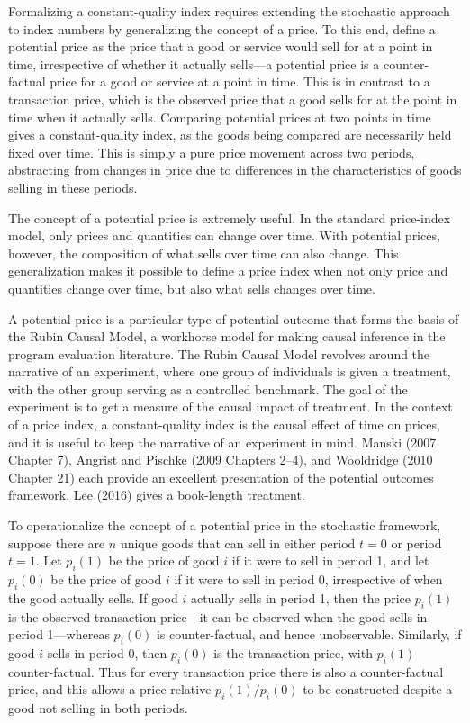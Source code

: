 \documentclass[]{article}
\begin{document}
Formalizing a constant-quality index requires extending the stochastic approach to index numbers by generalizing the concept of a price. To this end, define a potential price as the price that a good or service would sell for at a point in time, irrespective of whether it actually sells---a potential price is a counter-factual price for a good or service at a point in time. This is in contrast to a transaction price, which is the observed price that a good sells for at the point in time when it actually sells. Comparing potential prices at two points in time gives a constant-quality index, as the goods being compared are necessarily held fixed over time. This is simply a pure price movement across two periods, abstracting from changes in price due to differences in the characteristics of goods selling in these periods.

The concept of a potential price is extremely useful. In the standard price-index model, only prices and quantities can change over time. With potential prices, however, the composition of what sells over time can also change. This generalization makes it possible to define a price index when not only price and quantities change over time, but also what sells changes over time.

A potential price is a particular type of potential outcome that forms the basis of the Rubin Causal Model, a workhorse model for making causal inference in the program evaluation literature. The Rubin Causal Model revolves around the narrative of an experiment, where one group of individuals is given a treatment, with the other group serving as a controlled benchmark. The goal of the experiment is to get a measure of the causal impact of treatment. In the context of a price index, a constant-quality index is the causal effect of time on prices, and it is useful to keep the narrative of an experiment in mind. Manski (2007 Chapter 7), Angrist and Pischke (2009 Chapters 2--4), and Wooldridge (2010 Chapter 21) each provide an excellent presentation of the potential outcomes framework. Lee (2016) gives a book-length treatment.

To operationalize the concept of a potential price in the stochastic framework, suppose there are \(n\) unique goods that can sell in either period \(t = 0\) or period \(t = 1\). Let \(p_{i}(1)\) be the price of good \(i\) if it were to sell in period 1, and let \(p_{i}(0)\) be the price of good \(i\) if it were to sell in period 0, irrespective of when the good actually sells. If good \(i\) actually sells in period 1, then the price \(p_{i}(1)\) is the observed transaction price---it can be observed when the good sells in period 1---whereas \(p_{i}(0)\) is counter-factual, and hence unobservable. Similarly, if good \(i\) sells in period 0, then \(p_{i}(0)\) is the transaction price, with \(p_{i}(1)\) counter-factual. Thus for every transaction price there is also a counter-factual price, and this allows a price relative \(p_{i}(1) / p_{i}(0)\) to be constructed despite a good not selling in both periods.
\end{document}
